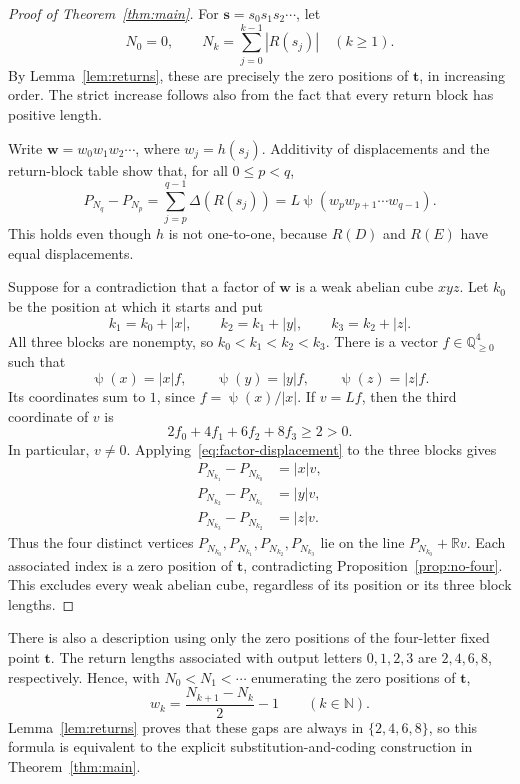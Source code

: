 \documentclass[12pt,reqno]{article}
\newcommand{\N}{\mathbb N}
\newcommand{\Q}{\mathbb{Q}}
\newcommand{\wt}{\mathbf{t}}
\newcommand{\ws}{\mathbf{s}}
\newcommand{\ww}{\mathbf{w}}
\DeclareMathOperator{\Par}{\psi}
\begin{document}
\begin{proof}[Proof of Theorem~\ref{thm:main}]
For $\ws=s_0s_1s_2\cdots$, let
\[
  N_0=0,\qquad N_k=\sum_{j=0}^{k-1}|R(s_j)|\quad(k\geq1).
\]
By Lemma~\ref{lem:returns}, these are precisely the zero positions of
$\wt$, in increasing order. The strict increase follows also from the
fact that every return block has positive length.

Write $\ww=w_0w_1w_2\cdots$, where $w_j=h(s_j)$. Additivity of
displacements and the return-block table show that, for all $0\leq p<q$,
\begin{equation}\label{eq:factor-displacement}
  P_{N_q}-P_{N_p}
  =\sum_{j=p}^{q-1}\Delta(R(s_j))
  =L\Par(w_p w_{p+1}\cdots w_{q-1}).
\end{equation}
This holds even though $h$ is not one-to-one, because $R(D)$ and $R(E)$
have equal displacements.

Suppose for a contradiction that a factor of $\ww$ is a weak abelian
cube $xyz$. Let $k_0$ be the position at which it starts and put
\[
  k_1=k_0+|x|,\qquad
  k_2=k_1+|y|,\qquad
  k_3=k_2+|z|.
\]
All three blocks are nonempty, so $k_0<k_1<k_2<k_3$.
There is a vector $f\in\Q_{\geq0}^4$ such that
\[
  \Par(x)=|x|f,\qquad
  \Par(y)=|y|f,\qquad
  \Par(z)=|z|f.
\]
Its coordinates sum to $1$, since $f=\Par(x)/|x|$. If $v=Lf$, then
the third coordinate of $v$ is
\[
  2f_0+4f_1+6f_2+8f_3\geq2>0.
\]
In particular, $v\ne0$. Applying~\eqref{eq:factor-displacement} to
the three blocks gives
\begin{align*}
  P_{N_{k_1}}-P_{N_{k_0}}&=|x|v,\\
  P_{N_{k_2}}-P_{N_{k_1}}&=|y|v,\\
  P_{N_{k_3}}-P_{N_{k_2}}&=|z|v.
\end{align*}
Thus the four distinct vertices $P_{N_{k_0}},P_{N_{k_1}},P_{N_{k_2}},
P_{N_{k_3}}$ lie on the line $P_{N_{k_0}}+\mathbb R v$.
Each associated index is a zero position of $\wt$, contradicting
Proposition~\ref{prop:no-four}. This excludes every weak abelian cube,
regardless of its position or its three block lengths.
\end{proof}

\begin{remark}
There is also a description using only the zero positions of the
four-letter fixed point $\wt$. The return lengths associated with
output letters $0,1,2,3$ are $2,4,6,8$, respectively. Hence, with
$N_0<N_1<\cdots$ enumerating the zero positions of $\wt$,
\[
  w_k=\frac{N_{k+1}-N_k}{2}-1\qquad(k\in\N).
\]
Lemma~\ref{lem:returns} proves that these gaps are always in
$\{2,4,6,8\}$, so this formula is equivalent to the explicit
substitution-and-coding construction in Theorem~\ref{thm:main}.
\end{remark}
\end{document}
